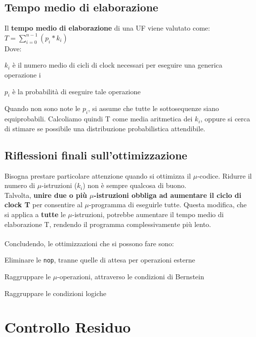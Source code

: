 \documentclass[10pt]{report}
\begin{document}
\subsection{Tempo medio di elaborazione}
Il \textbf{tempo medio di elaborazione} di una UF viene valutato come: \texttt{$T = \sum_{i = 0}^{n - 1}(p_i * k_i) $}\\
Dove:
\begin{list}{}{}
	\item $k_i$ è il numero medio di cicli di clock necessari per eseguire una generica operazione i
	\item $p_i$ è la probabilità di eseguire tale operazione
\end{list}
Quando non sono note le $p_i$, si assume che tutte le sottosequenze siano equiprobabili. Calcoliamo quindi T come media aritmetica dei $k_i$, oppure si cerca di stimare se possibile una distribuzione probabilistica attendibile.
\subsection{Riflessioni finali sull'ottimizzazione}
Bisogna prestare particolare attenzione quando si ottimizza il $\mu$-codice. Ridurre il numero di $\mu$-istruzioni ($k_i$) non è sempre qualcosa di buono.\\
Talvolta, \textbf{unire due o più $\mu$-istruzioni obbliga ad aumentare il ciclo di clock T} per consentire al $\mu$-programma di eseguirle tutte. Questa modifica, che si applica a \textbf{tutte} le $\mu$-istruzioni, potrebbe aumentare il tempo medio di elaborazione T, rendendo il programma complessivamente più lento.\\\\
Concludendo, le ottimizzazioni che si possono fare sono:
\begin{list}{}{}
	\item Eliminare le \texttt{nop}, tranne quelle di attesa per operazioni esterne
	\item Raggruppare le $\mu$-operazioni, attraverso le condizioni di Bernstein
	\item Raggruppare le condizioni logiche
\end{list}
\section{Controllo Residuo}
\pagebreak
\end{document}
